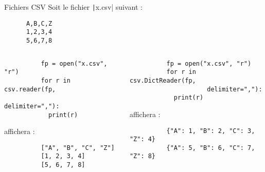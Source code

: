 \documentclass[10pt]{beamer}
\begin{document}
\begin{frame}[fragile]{Fichiers CSV}
  Soit le fichier \texttt|x.csv| suivant :

  \begin{beamercodeblock}
    \begin{verbatim}
      A,B,C,Z
      1,2,3,4
      5,6,7,8
    \end{verbatim}
  \end{beamercodeblock}

  \medskip

  \begin{columns}
    \begin{column}{0.48\textwidth}


      \begin{beamercodeblock}
        \begin{verbatim}
          fp = open("x.csv", "r")
          for r in csv.reader(fp, 
                     delimiter=","):
            print(r)
        \end{verbatim}
      \end{beamercodeblock}
      
      affichera :
      \smallskip

      \begin{beamercodeblock}
        \begin{verbatim}
          ["A", "B", "C", "Z"]
          [1, 2, 3, 4]
          [5, 6, 7, 8]
        \end{verbatim}
      \end{beamercodeblock}
    \end{column} \hfill
    \begin{column}{0.48\textwidth}


      \begin{beamercodeblock}
        \begin{verbatim}
          fp = open("x.csv", "r")
          for r in csv.DictReader(fp, 
                     delimiter=","):
            print(r)
        \end{verbatim}
      \end{beamercodeblock}

      affichera :
      \smallskip

      \begin{beamercodeblock}
        \begin{verbatim}
          {"A": 1, "B": 2, "C": 3, "Z": 4}
          {"A": 5, "B": 6, "C": 7, "Z": 8}

        \end{verbatim}
      \end{beamercodeblock}
    \end{column}
  \end{columns}
\end{frame}
\end{document}
